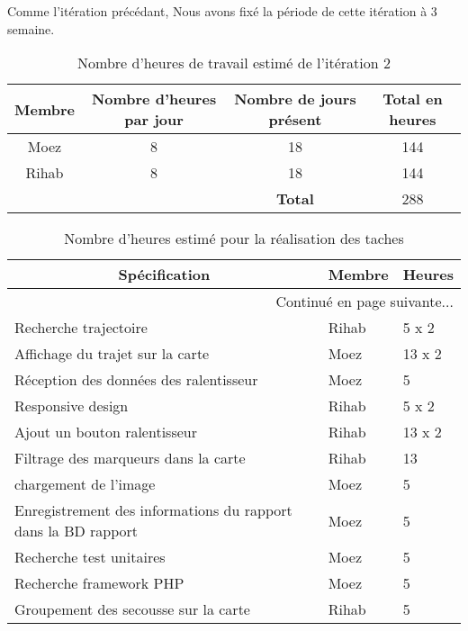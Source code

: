 Comme l'itération précédant, Nous avons fixé la période de cette itération à 3
semaine.

\begin{table}[htbp]
    \centering
    \begin{tabular}{| c | c | c | c |}
        \hline
        \textbf{Membre} & \textbf{Nombre d'heures par jour} & \textbf{Nombre de jours présent} & \textbf{Total en heures} \\ \hline
        \hline
Moez & 8 & 18& 144\\ \hline
Rihab & 8 & 18 & 144 \\ \hline
\multicolumn{2}{c|}{} & \textbf{Total} & 288 \\ \cline{3-4}
    \end{tabular}
    \caption{Nombre d'heures de travail estimé de l'itération 2}
    \label{tab:sprint2-capacity}
\end{table}

\begin{center}
    \begin{longtable}{| l | l | l |}
        \caption{Nombre d'heures estimé pour la réalisation des taches}
        \label{tab:sprint2-estimation} \\

        \hline
        \multicolumn{1}{|c}{\textbf{Spécification}} &
        \multicolumn{1}{|c}{\textbf{Membre}} &
        \multicolumn{1}{|c|}{\textbf{Heures}} \\ \hline
        \endhead

        \hline \multicolumn{3}{|r|}{{Continué en page suivante$\dotsc$}} \\ \hline
        \endfoot

        \hline \hline
        \endlastfoot

        \hline
Recherche trajectoire & Rihab & 5 x 2 \\ \hline
Affichage du trajet sur la carte& Moez & 13 x 2 \\ \hline
Réception des données des ralentisseur& Moez & 5 \\ \hline
Responsive design & Rihab & 5 x 2 \\ \hline
Ajout un bouton ralentisseur& Rihab & 13 x 2 \\ \hline
Filtrage des marqueurs dans la carte & Rihab & 13 \\ \hline
chargement de l'image & Moez & 5 \\ \hline
Enregistrement des informations du rapport dans la BD rapport & Moez & 5 \\ \hline
Recherche test unitaires & Moez & 5 \\ \hline
Recherche framework PHP & Moez & 5 \\ \hline
Groupement des secousse sur la carte & Rihab & 5 \\ \hline
    \end{longtable}
\end{center}

